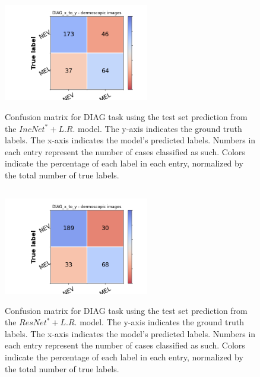 \subsection{\texorpdfstring{}{TEXT}}
\begin{figure}[ht]
\centering
{\includegraphics[width =2.5in]{images/appendice/stl/incnet+lr/DIAG_CM_x_to_y.png}}
\caption{Confusion matrix for DIAG task using the test set prediction
from the $IncNet^*+L.R.$ model. The y-axis indicates the ground truth labels. The x-axis indicates the model’s predicted labels. Numbers in each entry represent
the number of cases classified as such. Colors indicate the percentage of each
label in each entry, normalized by the total number of true labels.}
\label{incNet+lrCM}
\end{figure}

\subsection{\texorpdfstring{}{TEXT}}
\begin{figure}[ht]
\centering
{\includegraphics[width =2.5in]{images/appendice/stl/resnet+lr/DIAG_CM_x_to_y.png}}
\caption{Confusion matrix for DIAG task using the test set prediction
from the $ResNet^*+L.R.$ model. The y-axis indicates the ground truth labels. The x-axis indicates the model’s predicted labels. Numbers in each entry represent
the number of cases classified as such. Colors indicate the percentage of each
label in each entry, normalized by the total number of true labels.}
\label{resNet+lrCM}
\end{figure}



